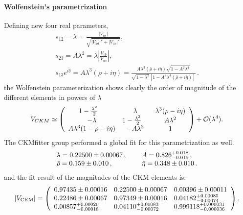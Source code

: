 \paragraph*{Wolfenstein's parametrization}
Defining new four real parameters, 
\begin{gather}
    s_{12}=\lambda={\frac{|V_{u s}|}{\sqrt{|V_{u d}|^{2}+|V_{u s}|^{2}}}} ,\\
    s_{23}=A\lambda^{2}=\lambda|\frac{V_{c b}}{V_{u s}}|,\\
    s_{13}e^{i\delta}=A\lambda^{3}(\rho+i\eta)=\frac{A\lambda^{3}(\bar{\rho}+i\bar{\eta})\sqrt{1-A^{2}\lambda^{4}}}{\sqrt{1-\lambda^{2}}\left[1-A^{2}\lambda^{4}(\bar{\rho}+i\bar{\eta})\right]}\,
.
\end{gather}
the Wolfenstein parameterization shows clearly the order of magnitude of the different elements in powers of $\lambda$
\begin{equation}
    V_{C K M}\simeq\left(\begin{array}{c c c}{{1-\frac{\lambda^{2}}2\ \ \ }}&{{\lambda}}&{{\lambda^{3}(\rho-i\eta)}}\\ {{-\lambda}}&{{1-\frac{\lambda^{2}}2\ \ \ }}&{{A\lambda^{2}}}\\ {{A\lambda^{3}(1-\rho-i\eta)}}&{{-A\lambda^{2}}}&{{1}}\end{array}\right)+{\cal O}(\lambda^{4}).
\end{equation}
The CKMfitter group performed a global fit for this parametrization as well.
\begin{equation}
    \begin{array}{l l}{{\lambda=0.22500\pm0.00067\,,~~~~}}&{{A=0.826_{-0.015}^{+0.018}\,,}}\\ {{\bar{\rho}=0.159\pm0.010\,{,~~~}}}&{{\bar{\eta}=0.348\pm0.010\,.}}\end{array}
\end{equation}
and the fit result of the magnitudes of the CKM elements is:
\begin{equation}
|V_{\mathrm{CKM}}|=\left(\begin{array}{l l l}{{0.97435\pm0.00016}}&{{0.22500\pm0.00067}} & {{0.00396\pm0.00011}}\\ {{0.22486\pm0.00067}}&{{0.97349\pm0.00016}}&{{0.04182^{+0.00085}_{-0.00074}}}\\ {{0.00857_{-0.00018}^{+0.00020}}}&{{0.04110_{-0.00072}^{+0.00083}}}&{{0.999118^{+0.000031}_{-0.000036}}}\end{array}\right).
\end{equation}
